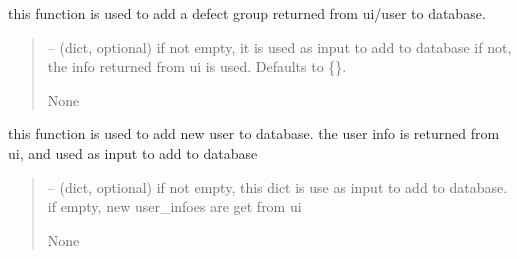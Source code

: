 \documentclass[letterpaper,10pt,english]{sphinxmanual}
\begin{document}
\begin{savenotes}
\begin{fulllineitems}

\begin{savenotes}\begin{fulllineitems}
\label{\detokenize{setting/setting_api:oxin.setting_api.API.add_defect_group}}
\pysigstartsignatures
{}
\pysigstopsignatures
\sphinxAtStartPar
this function is used to add a defect group returned from ui/user to database.
\begin{quote}\begin{description}
\sphinxAtStartPar
{} – (dict, optional) if not empty, it is used as input to add to database
if not, the info returned from ui is used. Defaults to \{\}.

\sphinxAtStartPar
None

\end{description}\end{quote}

\end{fulllineitems}\end{savenotes}


\begin{savenotes}\begin{fulllineitems}
\label{\detokenize{setting/setting_api:oxin.setting_api.API.add_user}}
\pysigstartsignatures
{}
\pysigstopsignatures
\sphinxAtStartPar
this function is used to add new user to database.
the user info is returned from ui, and used as input to add to database
\begin{quote}\begin{description}
\sphinxAtStartPar
{} – (dict, optional) if not empty, this dict is use as input to add to database. if empty, new user\_infoes are get
from ui

\sphinxAtStartPar
None


\end{description}
\end{quote}
\end{fulllineitems}
\end{savenotes}
\end{fulllineitems}
\end{savenotes}
\end{document}
